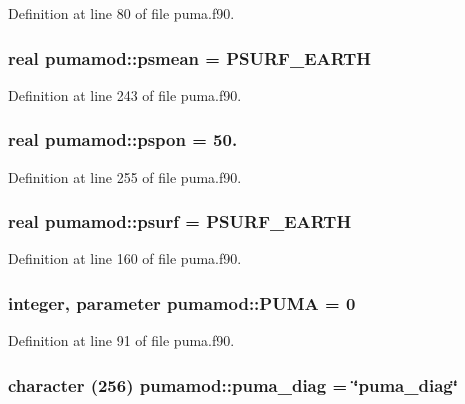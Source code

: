 \-Definition at line 80 of file puma.\-f90.

\hypertarget{classpumamod_ac68939034981424cca40dd948549d1a0}{
\subsubsection[{psmean}]{\setlength{\rightskip}{0pt plus 5cm}real {\bf pumamod\-::psmean} = \-P\-S\-U\-R\-F\-\_\-\-E\-A\-R\-T\-H}}
\label{classpumamod_ac68939034981424cca40dd948549d1a0}


\-Definition at line 243 of file puma.\-f90.

\hypertarget{classpumamod_a594702993f401d2641f71890a8f9f6f5}{
\subsubsection[{pspon}]{\setlength{\rightskip}{0pt plus 5cm}real {\bf pumamod\-::pspon} = 50.}}
\label{classpumamod_a594702993f401d2641f71890a8f9f6f5}


\-Definition at line 255 of file puma.\-f90.

\hypertarget{classpumamod_aecc1e882fcb2823bd6f2bc1448c1953d}{
\subsubsection[{psurf}]{\setlength{\rightskip}{0pt plus 5cm}real {\bf pumamod\-::psurf} = \-P\-S\-U\-R\-F\-\_\-\-E\-A\-R\-T\-H}}
\label{classpumamod_aecc1e882fcb2823bd6f2bc1448c1953d}


\-Definition at line 160 of file puma.\-f90.

\hypertarget{classpumamod_a6cfe02b5d7dfcb7850792dcc03ae3a45}{
\subsubsection[{\-P\-U\-M\-A}]{\setlength{\rightskip}{0pt plus 5cm}integer, parameter {\bf pumamod\-::\-P\-U\-M\-A} = 0}}
\label{classpumamod_a6cfe02b5d7dfcb7850792dcc03ae3a45}


\-Definition at line 91 of file puma.\-f90.

\hypertarget{classpumamod_ad11e2fd3e6aa83543bbc8acd0c59b7a0}{
\subsubsection[{puma\-\_\-diag}]{\setlength{\rightskip}{0pt plus 5cm}character (256) {\bf pumamod\-::puma\-\_\-diag} = \char`\"{}puma\-\_\-diag\char`\"{}}}
\label{classpumamod_ad11e2fd3e6aa83543bbc8acd0c59b7a0}


